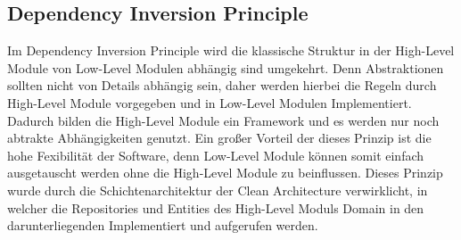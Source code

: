 \subsection{Dependency Inversion Principle}
Im Dependency Inversion Principle wird die klassische Struktur in der High-Level Module von Low-Level Modulen abhängig sind umgekehrt.
Denn Abstraktionen sollten nicht von Details abhängig sein, daher werden hierbei die Regeln durch High-Level Module vorgegeben und in Low-Level Modulen Implementiert.
Dadurch bilden die High-Level Module ein Framework und es werden nur noch abtrakte Abhängigkeiten genutzt.
Ein großer Vorteil der dieses Prinzip ist die hohe Fexibilität der Software, denn Low-Level Module können somit einfach ausgetauscht werden ohne die High-Level Module zu beinflussen.
Dieses Prinzip wurde durch die Schichtenarchitektur der Clean Architecture verwirklicht,
in welcher die Repositories und Entities des High-Level Moduls Domain in den darunterliegenden Implementiert und aufgerufen werden.



